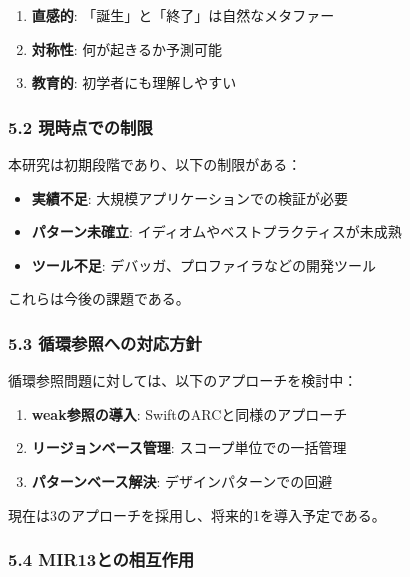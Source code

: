 \documentclass[
]{article}
\providecommand{\tightlist}{%
  \setlength{\itemsep}{0pt}\setlength{\parskip}{0pt}}
\begin{document}
\begin{enumerate}
\def\labelenumi{\arabic{enumi}.}
\tightlist
\item
  \textbf{直感的}: 「誕生」と「終了」は自然なメタファー
\item
  \textbf{対称性}: 何が起きるか予測可能
\item
  \textbf{教育的}: 初学者にも理解しやすい
\end{enumerate}

\hypertarget{ux73feux6642ux70b9ux3067ux306eux5236ux9650}{%
\subsubsection{5.2
現時点での制限}\label{ux73feux6642ux70b9ux3067ux306eux5236ux9650}}

本研究は初期段階であり、以下の制限がある：

\begin{itemize}
\tightlist
\item
  \textbf{実績不足}: 大規模アプリケーションでの検証が必要
\item
  \textbf{パターン未確立}: イディオムやベストプラクティスが未成熟
\item
  \textbf{ツール不足}: デバッガ、プロファイラなどの開発ツール
\end{itemize}

これらは今後の課題である。

\hypertarget{ux5faaux74b0ux53c2ux7167ux3078ux306eux5bfeux5fdcux65b9ux91dd}{%
\subsubsection{5.3
循環参照への対応方針}\label{ux5faaux74b0ux53c2ux7167ux3078ux306eux5bfeux5fdcux65b9ux91dd}}

循環参照問題に対しては、以下のアプローチを検討中：

\begin{enumerate}
\def\labelenumi{\arabic{enumi}.}
\tightlist
\item
  \textbf{weak参照の導入}: SwiftのARCと同様のアプローチ
\item
  \textbf{リージョンベース管理}: スコープ単位での一括管理
\item
  \textbf{パターンベース解決}: デザインパターンでの回避
\end{enumerate}

現在は3のアプローチを採用し、将来的1を導入予定である。

\hypertarget{mir13ux3068ux306eux76f8ux4e92ux4f5cux7528}{%
\subsubsection{5.4
MIR13との相互作用}\label{mir13ux3068ux306eux76f8ux4e92ux4f5cux7528}}
\end{document}
